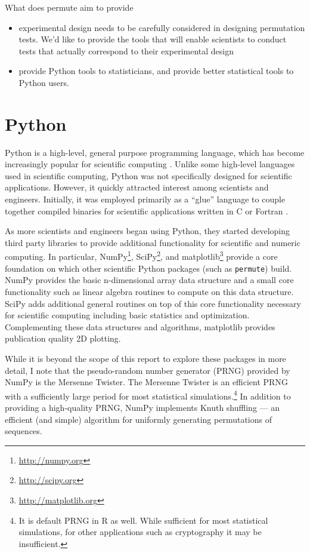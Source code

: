 What does permute aim to provide
\begin{itemize}
\item experimental design needs to be carefully considered in designing
  permutation tests. We'd like to provide the tools that will enable scientists
  to conduct tests that actually correspond to their experimental design
\item provide Python tools to statisticians, and provide better statistical
  tools to Python users.
\end{itemize}

\section{Python}

Python is a high-level, general purpose programming language, which has become
increasingly popular for scientific computing \cite{millman2011python,
Perez2011}. Unlike some high-level languages used in scientific computing,
Python was not specifically designed for scientific applications.  However, it
quickly attracted interest among scientists and engineers.  Initially, it was
employed primarily as a ``glue'' language to couple together compiled binaries
for scientific applications written in C or Fortran \cite{dubois2007guest}.

As more scientists and engineers began using Python, they started developing
third party libraries to provide additional functionality for scientific
and numeric computing.  In particular, NumPy\footnote{\url{http://numpy.org}},
SciPy\footnote{\url{http://scipy.org}}, and matplotlib\footnote{
\url{http://matplotlib.org}} provide a core foundation on which other
scientific Python packages (such as \texttt{permute}) build. NumPy
provides the basic n-dimensional array data structure and a small core
functionality such as linear algebra routines to compute on this
data structure.  SciPy adds additional general routines on top
of this core functionality necessary for scientific computing including
basic statistics and optimization.  Complementing these data structures
and algorithms, matplotlib provides publication quality 2D plotting.  

While it is beyond the scope of this report to explore these packages in more
detail, I note that the pseudo-random number generator (PRNG) provided by NumPy
is the Mersenne Twister.  The Mersenne Twister is an efficient PRNG with a
sufficiently large period for most statistical simulations.\footnote{It is
default PRNG in R as well.  While sufficient for most statistical simulations,
for other applications such as cryptography it may be insufficient.}  In
addition to providing a high-quality PRNG, NumPy implements Knuth shuffling ---
an efficient (and simple) algorithm for uniformly generating permutations of
sequences.

